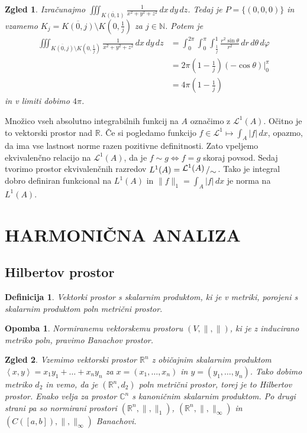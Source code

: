 \documentclass[10pt, a4paper]{article}
\newtheorem{defi}{Definicija}[section]
\newenvironment{noticeB}{%
  \tcolorbox[%
  notitle,
  empty,
  enhanced,  %
  breakable,
  coltext=black,
  colback=white, 
  fontupper=\rmfamily,
  parbox=false,
  noparskip,
  sharp corners,
  boxrule=-1pt,  %
  frame hidden,
  left=7pt,  %
  right=7pt,
  top=5pt,
  bottom=5pt,
  before skip=2.5ex plus 2pt,
  after skip=2.5ex plus 2pt,
  borderline west = {1.5pt}{-0.1pt}{blue!30!black}, %
  overlay unbroken and last={%
    \draw[color=black, line width=1.25pt]
    ($(frame.south west)+(1.pt, -0.1pt)$) -- ++(2em, 0);
  }
  ]}
{\endtcolorbox}
\newenvironment{definicija}{\begin{defi}\begin{noticeB}}{%
    \end{noticeB}\end{defi}}
\newtheorem*{opomba}{Opomba}
\newtheorem{zgled}{Zgled}[section]
\newcommand{\N}{\mathbb {N}}
\newcommand{\R}{\mathbb {R}}
\newcommand{\C}{\mathbb {C}}
\newcommand{\quot}[2]{{\raisebox{.2em}{$#1$}\left/\raisebox{-.2em}{$#2$}\right.}}
\newcommand{\sprod}[2]{\left\langle {#1},{#2} \right\rangle}
\begin{document}
\begin{zgled}
    Izračunajmo $\iiint_{\overline{K(0, 1)}} \frac{1}{x^2 + y^2 + z^2}\, dx\, dy\, dz$.
    Tedaj je $P = \{(0, 0, 0)\}$ in vzamemo $K_j = \overline{K(0, j)} \setminus K\left(0, \frac{1}{j}\right)$
    za $j \in \N$. Potem je 
    \begin{align*}
        \iiint_{\overline{K(0, j)} \setminus K\left(0, \frac{1}{j}\right)} \frac{1}{x^2 + y^2 + z^2}\, dx\, dy\, dz 
        &= \int_0 ^{2\pi} \int_0 ^\pi \int_{\frac{1}{j}} ^1 \frac{r^2 \sin \theta}{r^2} \, dr\, d\theta\, d\varphi\\
        &= 2 \pi \left(1 - \frac{1}{j}\right) (-\cos \theta)\Big|_0 ^\pi\\
        &= 4 \pi \left(1 - \frac{1}{j}\right)
    \end{align*}
    in v limiti dobimo $4\pi$.
\end{zgled}

Množico vseh absolutno integrabilnih funkcij na $A$ označimo z $\mathcal{L}^1 (A)$.
Očitno je to vektorski prostor nad $\R$. Če si pogledamo funkcijo $f \in \mathcal{L}^1 \mapsto \int_A |f|\, dx$,
opazmo, da ima vse lastnost norme razen pozitivne definitnosti.
Zato vpeljemo ekvivalenčno relacijo na $\mathcal{L}^1 (A)$, da je $f \sim g \Leftrightarrow f = g$ skoraj povsod.
Sedaj tvorimo prostor ekvivalenčnih razredov $L^1 (A) = \quot{\mathcal{L}^1 (A)}{\sim}$.
Tako je integral dobro definiran funkcional na $L^1 (A)$ in 
$\| f\|_1 = \int_A |f|\, dx$ je norma na $L^1 (A)$.

\clearpage
\section{HARMONIČNA ANALIZA}

\subsection{Hilbertov prostor}

\begin{definicija}
    Vektorki prostor s skalarnim produktom, ki je v metriki, porojeni s skalarnim produktom 
    poln metrični prostor.
\end{definicija}

\begin{opomba}
    Normiranemu vektorskemu prostoru $(V, \|,\|)$, ki je z inducirano metriko poln, pravimo Banachov prostor.
\end{opomba}

\begin{zgled}
    Vzemimo vektorski prostor $\R^n$ z običajnim skalarnim produktom
    $\sprod{x}{y} = x_1 y_1 + \dots + x_n y_n$
    za $x = (x_1, \dots, x_n)$ in $y = (y_1, \dots, y_n)$.
    Tako dobimo metriko $d_2$ in vemo, da je $(\R^n, d_2)$ poln metrični prostor,
    torej je to Hilbertov prostor. Enako velja za prostor $\C^n$ s kanoničnim skalarnim produktom.
    Po drugi strani pa so normirani prostori $(\R^n, \|,\|_1)$, $(\R^n, \|,\|_\infty)$ 
    in $(C([a, b]), \|,\|_\infty)$ Banachovi.
\end{zgled}
\end{document}

